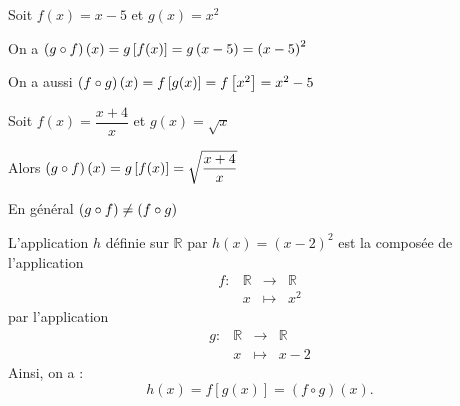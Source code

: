   \begin{example}
 
 Soit $ f(x)= x-5 $  et $ g(x)=x^{2} $
 
 
 On a $ \left(g\circ f\right)(x)=g\left[ f(x) \right]= g\left(x-5\right)=\left(x-5\right)^{2} $
 


  On a aussi $ \left(f\circ g\right)(x)=f\left[ g(x) \right]= f\left[ x^{2} \right]=x^{2}-5 $
 \end{example}

 
 \begin{example}
 
 Soit $ f(x)= \dfrac{x+4}{x} $  et $ g(x)=\sqrt{x} $

Alors \;  $ \left(g\circ f\right)(x)=g\left[ f(x) \right]= \sqrt{\dfrac{x+4}{x}} $
  \end{example}
 
 \begin{remark}
  En général $ \left(g\circ f\right) \neq  \left(f\circ g\right)$
 \end{remark}
 \begin{example}[Reconnaissance]
 
 L'application $h$ définie sur $\mathbb{R}$ par $h(x) = (x - 2)^2$ est la composée de l'application
 \[ \begin{array}{lrcl}
   f  : & \mathbb{R}  &   \longrightarrow & \mathbb{R} \\ 
  &  x & \longmapsto & x^2
\end{array}\]
par l'application
 \[ \begin{array}{lrcl}
   g  : & \mathbb{R}  &   \longrightarrow & \mathbb{R} \\ 
  &  x & \longmapsto & x-2
\end{array}\]
Ainsi, on a : 
\[
h(x) = f[g(x)] = (f \circ g)(x).
\]
 \end{example}

